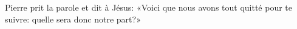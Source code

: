 \encetemps Pierre prit la parole et dit à Jésus:
	«Voici que nous avons tout quitté pour te suivre:
	quelle sera donc notre part?»
